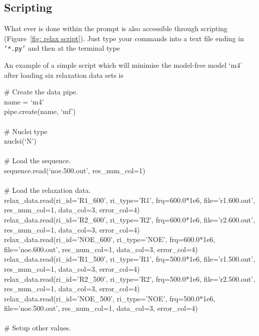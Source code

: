 \subsection{Scripting}

What ever is done within the prompt is also accessible through scripting (Figure~\ref{fig: relax script}).  Just type your commands into a text file ending in \texttt{`*.py'} and then at the terminal type


An example of a simple script which will minimise the model-free model `m4' after loading six relaxation data sets is

\begin{exampleenv}
\# Create the data pipe. \\
name = `m4' \\
pipe.create(name, `mf') \\
 \\
\# Nuclei type \\
nuclei(`N') \\
 \\
\# Load the sequence. \\
sequence.read(`noe.500.out', res\_num\_col=1) \\
 \\
\# Load the relaxation data. \\
relax\_data.read(ri\_id='R1\_600',  ri\_type='R1',  frq=600.0*1e6, file='r1.600.out', res\_num\_col=1, data\_col=3, error\_col=4) \\
relax\_data.read(ri\_id='R2\_600',  ri\_type='R2',  frq=600.0*1e6, file='r2.600.out', res\_num\_col=1, data\_col=3, error\_col=4) \\
relax\_data.read(ri\_id='NOE\_600', ri\_type='NOE', frq=600.0*1e6, file='noe.600.out', res\_num\_col=1, data\_col=3, error\_col=4) \\
relax\_data.read(ri\_id='R1\_500',  ri\_type='R1',  frq=500.0*1e6, file='r1.500.out', res\_num\_col=1, data\_col=3, error\_col=4) \\
relax\_data.read(ri\_id='R2\_500',  ri\_type='R2',  frq=500.0*1e6, file='r2.500.out', res\_num\_col=1, data\_col=3, error\_col=4) \\
relax\_data.read(ri\_id='NOE\_500', ri\_type='NOE', frq=500.0*1e6, file='noe.500.out', res\_num\_col=1, data\_col=3, error\_col=4) \\
 \\
\# Setup other values. \\

\end{exampleenv}
